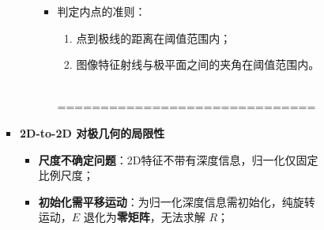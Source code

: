 \documentclass[../main.tex]{subfiles}
\begin{document}
\begin{enumerate}
\begin{itemize}
\begin{enumerate}
\begin{itemize}
\begin{itemize}
\begin{small}
\begin{itemize}
\begin{itemize}
            \item 判定内点的准则：
            \begin{enumerate}
                \item 点到极线的距离在阈值范围内；
                \item 图像特征射线与极平面之间的夹角在阈值范围内。
            \end{enumerate}
        \\==============================
        \end{itemize}
        \end{itemize}
        \end{small}
        \item \textbf{2D-to-2D 对极几何的局限性}
        \begin{itemize}
            \item \textbf{尺度不确定问题}：2D特征不带有深度信息，归一化仅固定比例尺度；
            \item \textbf{初始化需平移运动}：为归一化深度信息需初始化，纯旋转运动，$E$ 退化为\textbf{零矩阵}，无法求解 $R$；
        \end{itemize}


\end{itemize}
\end{itemize}
\end{enumerate}
\end{itemize}
\end{enumerate}
\end{document}
